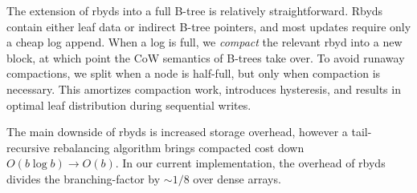 \documentclass[letterpaper,twocolumn,10pt]{article}
\begin{document}
The extension of rbyds into a full B-tree is relatively straightforward.
Rbyds contain either leaf data or indirect B-tree pointers, and most
updates require only a cheap log append. When a log is full, we \emph{compact}
the relevant rbyd into a new block, at which point the CoW
semantics of B-trees take over.
To avoid runaway compactions, we split when a node is half-full, but
only when compaction is necessary.
This
amortizes compaction work,
introduces hysteresis, and results in
optimal
leaf distribution during
sequential writes.


The main downside of rbyds is increased storage overhead, however a
tail-recursive rebalancing algorithm brings compacted cost down
$O(b \log b) \rightarrow O(b)$.
In our current implementation, the overhead of rbyds divides the
branching-factor by ${\sim}1/8$ over dense arrays.



%
%
%
%
\end{document}
